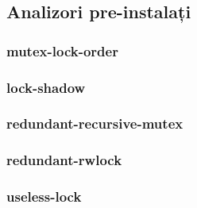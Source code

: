 \subsection{Analizori pre-instalați}
\label{analyzers}

\subsubsection{mutex-lock-order}

\subsubsection{lock-shadow}

\subsubsection{redundant-recursive-mutex}

\subsubsection{redundant-rwlock}

\subsubsection{useless-lock}
